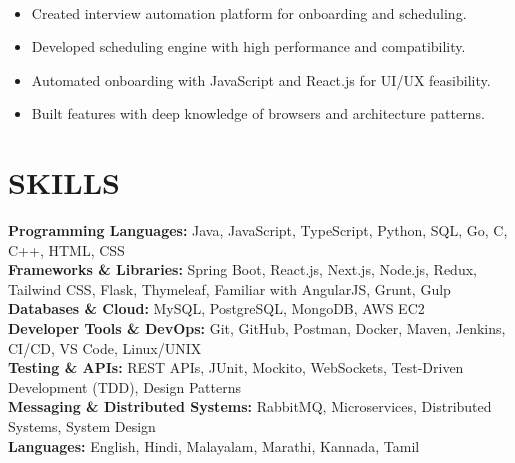 \documentclass[10pt,a4paper]{article}
\begin{document}
\noindent
{}\\[-12pt]

\begin{itemize}

\item Created interview automation platform for onboarding and scheduling.

\item Developed scheduling engine with high performance and compatibility.

\item Automated onboarding with JavaScript and React.js for UI/UX feasibility.

\item Built features with deep knowledge of browsers and architecture patterns.

\end{itemize}
\section*{SKILLS}

\small

\textbf{Programming Languages:}
Java, JavaScript, TypeScript, Python, SQL, Go, C, C++, HTML, CSS
\\[2pt]
\textbf{Frameworks \& Libraries:}
Spring Boot, React.js, Next.js, Node.js, Redux, Tailwind CSS, Flask, Thymeleaf, Familiar with AngularJS, Grunt, Gulp
\\[2pt]
\textbf{Databases \& Cloud:}
MySQL, PostgreSQL, MongoDB, AWS EC2
\\[2pt]
\textbf{Developer Tools \& DevOps:}
Git, GitHub, Postman, Docker, Maven, Jenkins, CI/CD, VS Code, Linux/UNIX
\\[2pt]
\textbf{Testing \& APIs:}
REST APIs, JUnit, Mockito, WebSockets, Test-Driven Development (TDD), Design Patterns
\\[2pt]
\textbf{Messaging \& Distributed Systems:}
RabbitMQ, Microservices, Distributed Systems, System Design
\\[2pt]
\textbf{Languages:}
English, Hindi, Malayalam, Marathi, Kannada, Tamil

\end{document}
